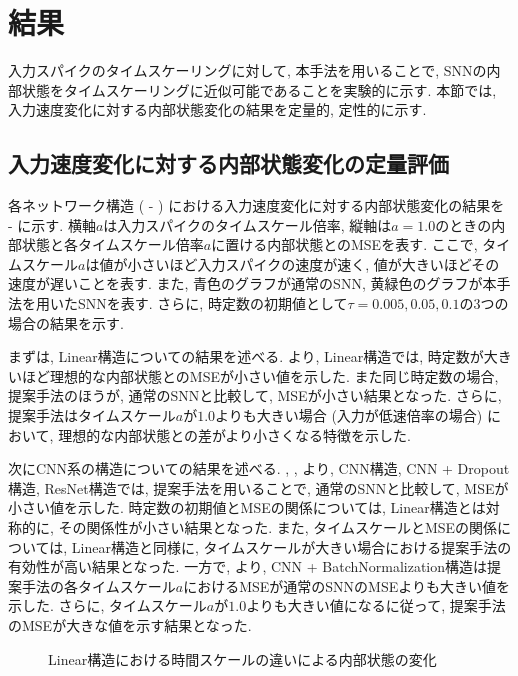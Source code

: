 \section{結果} \label{sec:result1}
入力スパイクのタイムスケーリングに対して, 本手法を用いることで, SNNの内部状態をタイムスケーリングに近似可能であることを実験的に示す.
本節では, 入力速度変化に対する内部状態変化の結果を定量的, 定性的に示す.

\subsection{入力速度変化に対する内部状態変化の定量評価}
各ネットワーク構造 ( - ) における入力速度変化に対する内部状態変化の結果を -  に示す.
横軸$a$は入力スパイクのタイムスケール倍率, 縦軸は$a=1.0$のときの内部状態と各タイムスケール倍率$a$に置ける内部状態とのMSEを表す.
ここで, タイムスケール$a$は値が小さいほど入力スパイクの速度が速く, 値が大きいほどその速度が遅いことを表す.
また, 青色のグラフが通常のSNN, 黄緑色のグラフが本手法を用いたSNNを表す.
さらに, 時定数の初期値として$\tau=0.005, 0.05, 0.1$の3つの場合の結果を示す.

まずは, Linear構造についての結果を述べる.
より, Linear構造では, 時定数が大きいほど理想的な内部状態とのMSEが小さい値を示した.
また同じ時定数の場合, 提案手法のほうが, 通常のSNNと比較して, MSEが小さい結果となった.
さらに, 提案手法はタイムスケール$a$が$1.0$よりも大きい場合 (入力が低速倍率の場合) において, 理想的な内部状態との差がより小さくなる特徴を示した.

次にCNN系の構造についての結果を述べる.
, , より, CNN構造, CNN + Dropout構造, ResNet構造では, 提案手法を用いることで, 通常のSNNと比較して, MSEが小さい値を示した.
時定数の初期値とMSEの関係については, Linear構造とは対称的に, その関係性が小さい結果となった.
また, タイムスケールとMSEの関係については, Linear構造と同様に, タイムスケールが大きい場合における提案手法の有効性が高い結果となった.
一方で, より, CNN + BatchNormalization構造は提案手法の各タイムスケール$a$におけるMSEが通常のSNNのMSEよりも大きい値を示した.
さらに, タイムスケール$a$が$1.0$よりも大きい値になるに従って, 提案手法のMSEが大きな値を示す結果となった.
\begin{figure}[htb]
    \centering
    
    \caption{Linear構造における時間スケールの違いによる内部状態の変化}
    \label{fig:result1:1:linear}
\end{figure}

